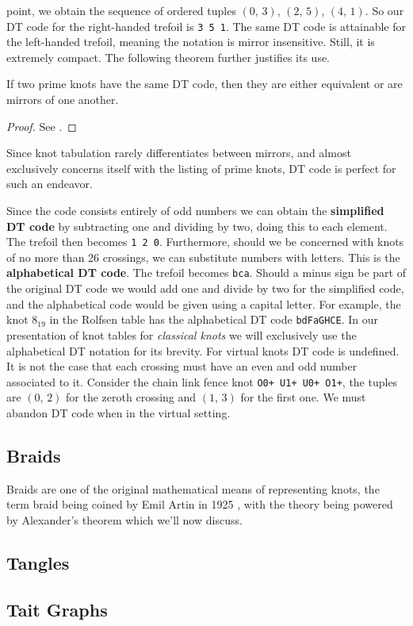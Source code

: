         point, we obtain the sequence of ordered tuples
        $(0,\,3)$, $(2,\,5)$, $(4,\,1)$. So our DT code for the right-handed
        trefoil is \texttt{3 5 1}. The same DT code is attainable for the
        left-handed trefoil, meaning the notation is mirror insensitive. Still,
        it is extremely compact. The following theorem further justifies its
        use.
        \begin{theorem}
            If two prime knots have the same DT code, then they are either
            equivalent or are mirrors of one another.
        \end{theorem}
        \begin{proof}
            See \cite{DOWKER198319}.
        \end{proof}
        Since knot tabulation rarely differentiates between mirrors, and
        almost exclusively concerns itself with the listing of prime knots,
        DT code is perfect for such an endeavor.
        \par\hfill\par
        Since the code consists entirely of odd numbers we can obtain the
        \textbf{simplified DT code} by subtracting one and dividing by two,
        doing this to each element. The trefoil then becomes
        \texttt{1 2 0}. Furthermore, should we be concerned with knots of
        no more than 26 crossings, we can substitute numbers with letters.
        This is the \textbf{alphabetical DT code}. The trefoil becomes
        \texttt{bca}. Should a minus sign be part of the original DT code
        we would add one and divide by two for the simplified code, and the
        alphabetical code would be given using a capital letter. For example,
        the knot $8_{19}$ in the Rolfsen table
        has the alphabetical DT code \texttt{bdFaGHCE}. In our presentation of
        knot tables for \textit{classical knots} we will exclusively use the
        alphabetical DT notation for its brevity. For virtual knots DT code is
        undefined. It is not the case that each crossing must have an even and
        odd number associated to it. Consider the chain link fence knot
        \texttt{O0+ U1+ U0+ O1+}, the tuples are $(0,\,2)$ for the zeroth
        crossing and $(1,\,3)$ for the first one. We must abandon DT code when
        in the virtual setting.
        \par\hfill\par
    \subsection{Braids}
        Braids are one of the original mathematical means of representing knots,
        the term braid being coined by Emil Artin in 1925
        \cite{ArtinBraidTheory1925}, with the theory being powered by
        Alexander's theorem which we'll now discuss.
    \begin{figure}
        \centering
    \end{figure}
    \subsection{Tangles}
    \subsection{Tait Graphs}

